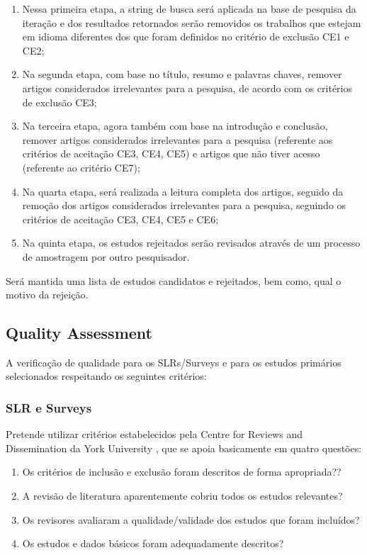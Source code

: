 \begin{enumerate}[label=Etapa\arabic*:]
    \item Nessa primeira etapa, a string de busca será aplicada na base de pesquisa da iteração e dos resultados retornados serão removidos os trabalhos que estejam em idioma diferentes dos que foram definidos no critério de exclusão CE1 e CE2;
    \item Na segunda etapa, com base no título, resumo e palavras chaves, remover artigos considerados irrelevantes para a pesquisa, de acordo com os critérios de exclusão CE3;
    \item Na terceira etapa, agora também com base na introdução e conclusão, remover artigos considerados irrelevantes para a pesquisa (referente aos critérios de aceitação CE3, CE4, CE5) e artigos que não tiver acesso (referente ao critério CE7);
    \item Na quarta etapa, será realizada a leitura completa dos artigos, seguido da remoção dos  artigos considerados irrelevantes para a pesquisa, seguindo os critérios de aceitação CE3, CE4, CE5 e CE6;
    \item Na quinta etapa, os estudos rejeitados serão revisados através de um processo de amostragem por outro pesquisador. 
\end{enumerate}

Será mantida uma lista de estudos candidatos e rejeitados, bem como, qual o motivo da rejeição. 

\subsection{Quality Assessment}

A verificação de qualidade para os SLRs/Surveys e para os estudos primários selecionados respeitando os seguintes critérios: 

\subsubsection{SLR e Surveys}

Pretende utilizar critérios estabelecidos pela Centre for Reviews and Dissemination \cite{crc2023}  da York University \cite{york2023}, que se apoia basicamente em  quatro questões:

\begin{enumerate}
    \item Os critérios de inclusão e exclusão foram descritos de forma apropriada?? 
    \item A revisão de literatura aparentemente cobriu todos os estudos relevantes? 
    \item Os revisores avaliaram a qualidade/validade dos estudos que foram incluídos? 
    \item Os estudos e dados básicos foram adequadamente descritos?
\end{enumerate}

